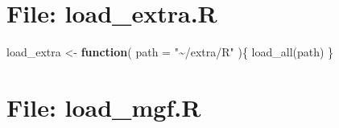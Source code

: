 \documentclass[
]{article}
\newenvironment{Shaded}{\begin{snugshade}}{\end{snugshade}}
\newcommand{\AttributeTok}[1]{\textcolor[rgb]{0.77,0.63,0.00}{#1}}
\newcommand{\ControlFlowTok}[1]{\textcolor[rgb]{0.13,0.29,0.53}{\textbf{#1}}}
\newcommand{\FunctionTok}[1]{\textcolor[rgb]{0.00,0.00,0.00}{#1}}
\newcommand{\NormalTok}[1]{#1}
\newcommand{\OtherTok}[1]{\textcolor[rgb]{0.56,0.35,0.01}{#1}}
\newcommand{\StringTok}[1]{\textcolor[rgb]{0.31,0.60,0.02}{#1}}
\begin{document}
\hypertarget{file-load_extra.r}{%
\section{File: load\_extra.R}\label{file-load_extra.r}}

\begin{Shaded}
\begin{Highlighting}[]
\NormalTok{load\_extra }\OtherTok{\textless{}{-}} 
  \ControlFlowTok{function}\NormalTok{(}
           \AttributeTok{path =} \StringTok{"\textasciitilde{}/extra/R"}
\NormalTok{           )\{}
    \FunctionTok{load\_all}\NormalTok{(path)}
\NormalTok{  \}}
\end{Highlighting}
\end{Shaded}

\hypertarget{file-load_mgf.r}{%
\section{File: load\_mgf.R}\label{file-load_mgf.r}}
\end{document}
